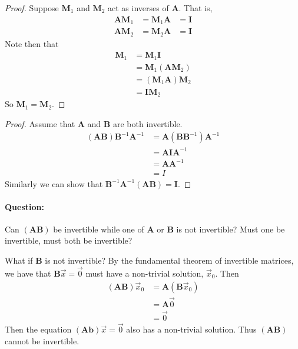 \documentclass[11pt]{article}
\newcommand{\ques}{\paragraph{Question:}}
\newcommand{\mat}[1]{\mathbf{#1}}
\newcommand{\vek}[1]{\vec{#1}}
\begin{document}
\begin{proof}
Suppose $\mat{M}_1$ and $\mat{M}_2$ act as inverses of $\mat{A}$. That is,
\begin{align*}
\mat{A} \mat{M}_1 &= \mat{M}_1 \mat{A} &= \mat{I}
\\
\mat{A} \mat{M}_2 &= \mat{M}_2 \mat{A} &= \mat{I}
\end{align*}
Note then that
\begin{align*}
\mat{M}_1 &= \mat{M}_1 \mat{I}
\\
&= \mat{M}_1 \left( \mat{A} \mat{M}_2 \right)
\\
&= \left( \mat{M}_1 \mat{A} \right) \mat{M}_2
\\
&= \mat{I} \mat{M}_2
\end{align*}
So $\mat{M}_1 = \mat{M}_2$.
\end{proof}

\begin{proof}
Assume that $\mat{A}$ and $\mat{B}$ are both invertible.
\begin{align*}
\left( \mat{A} \mat{B} \right) \mat{B}^{-1} \mat{A}^{-1} &=
\mat{A} \left( \mat{B} \mat{B}^{-1} \right) \mat{A}^{-1}
\\
&= \mat{A} \mat{I} \mat{A}^{-1}
\\
&= \mat{A} \mat{A}^{-1}
\\
&= I
\end{align*}
Similarly we can show that $\mat{B}^{-1} \mat{A}^{-1} \left( \mat{A} \mat{B} \right) = \mat{I}$.
\end{proof}

\ques Can $\left( \mat{A} \mat{B} \right)$ be invertible while one of $\mat{A}$ or $\mat{B}$ is not invertible? Must one be invertible, must both be invertible?

What if $\mat{B}$ is not invertible? By the fundamental theorem of invertible matrices, we have that $\mat{B} \vek{x} = \vek{0}$ must have a non-trivial solution, $\vek{x}_0$. Then
\begin{align*}
\left( \mat{A} \mat{B} \right) \vek{x}_0
&= \mat{A} \left( \mat{B} \vek{x}_0 \right)
\\
&= \mat{A} \vek{0}
\\
&= \vek{0}
\end{align*}
Then the equation $\left( \mat{A} \mat{b} \right) \vek{x} = \vek{0}$ also has a non-trivial solution. Thus $\left(\mat{A}\mat{B}\right)$ cannot be invertible.
\end{document}
